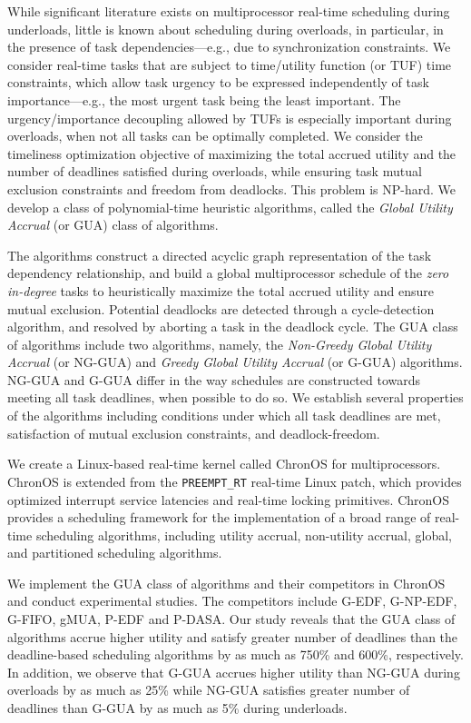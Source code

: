 \documentclass[12pt,dvips]{report}
\begin{document}
While significant literature exists on multiprocessor real-time scheduling during underloads, little is known about scheduling during overloads, in particular, in the presence of task dependencies---e.g., due to synchronization constraints. We consider real-time tasks that are subject to time/utility function (or TUF) time constraints, which allow task urgency to be expressed independently of task importance---e.g., the most urgent task being the least important. The urgency/importance decoupling allowed by TUFs is especially important during overloads, when not all tasks can be optimally completed. We consider the timeliness optimization objective of maximizing the total accrued utility and the number of deadlines satisfied during overloads, while ensuring task mutual exclusion constraints and freedom from deadlocks. This problem is NP-hard. We develop a class of polynomial-time heuristic algorithms, called the \textit{Global Utility Accrual} (or GUA) class of algorithms. 

The algorithms construct a directed acyclic graph representation of the task dependency relationship, and build a global multiprocessor schedule of the \textit{zero in-degree} tasks to heuristically maximize the total accrued utility and ensure mutual exclusion. Potential deadlocks are detected through a cycle-detection algorithm, and resolved by aborting a task in the deadlock cycle. The GUA class of algorithms include two algorithms, namely, the \textit{Non-Greedy Global Utility Accrual} (or NG-GUA) and \textit{Greedy Global Utility Accrual} (or G-GUA) algorithms. NG-GUA and G-GUA differ in the way schedules are constructed towards meeting all task deadlines, when possible to do so. We establish several properties of the algorithms including conditions under which all task deadlines are met, satisfaction of mutual exclusion constraints, and deadlock-freedom. 

We create a Linux-based real-time kernel called ChronOS for multiprocessors. ChronOS is extended from  the \texttt{PREEMPT\_RT} real-time Linux patch, which provides optimized interrupt service latencies and real-time locking primitives. ChronOS provides a scheduling framework for the implementation of a broad range of real-time scheduling algorithms, including utility accrual, non-utility accrual, global, and partitioned scheduling algorithms.

We implement the GUA class of algorithms and their competitors in ChronOS and conduct experimental studies. The competitors include G-EDF, G-NP-EDF, G-FIFO, gMUA, P-EDF and P-DASA. Our study reveals that the GUA class of algorithms accrue higher utility and satisfy greater number of deadlines than the deadline-based scheduling algorithms by as much as 750\% and 600\%, respectively. In addition, we observe that G-GUA accrues higher utility than NG-GUA during overloads by as much as 25\% while NG-GUA satisfies greater number of deadlines than G-GUA by as much as 5\% during underloads.
\end{document}

